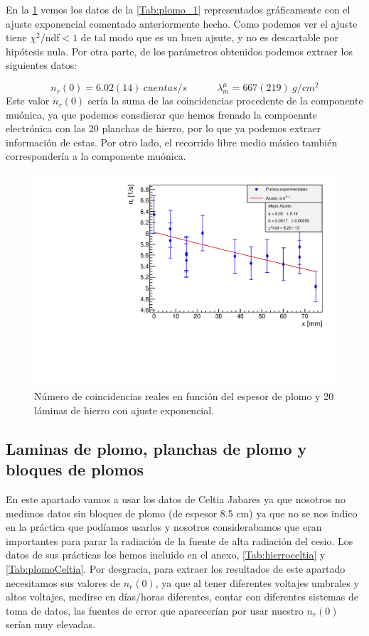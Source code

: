 \documentclass[11pt]{article}
\newcommand{\tquad}{\quad \quad \quad}
\begin{document}
En la \cref{Fig:plomohierro} vemos los datos de la \cref{Tab:plomo_1} representados gráficamente con el ajuste exponencial comentado anteriormente hecho. Como podemos ver el ajuste tiene $\chi^2/$ndf$<1$ de tal modo que es un buen ajsute, y no es descartable por hipótesis nula. Por otra parte, de los parámetros obtenidos podemos extraer los siguientes datos: 

\begin{equation}
	n_r(0) = 6.02(14) \ \unit{cuentas/s}  \tquad \lambda^\mu_m = 667(219) \ \unit{g/cm^2}
\end{equation}
Este valor $n_r(0)$ sería la suma de las coincidencias procedente de la componente muónica, ya que podemos consdierar que hemos frenado la compoennte electrónica con las 20 planchas de hierro, por lo que ya podemos extraer información de estas. Por otro lado, el recorrido libre medio másico también correspondería a la componente muónica. 

\begin{figure}[h!] \centering	
	\caption{Número de coincidencias reales en función del espesor de plomo y 20 láminas de hierro con ajuste exponencial.}
	\label{Fig:plomohierro}
	\includegraphics[width=0.72\linewidth]{../Graficas/Plomo.pdf}
\end{figure}

\subsection{Laminas de plomo, planchas de plomo y bloques de plomos}

En este apartado vamos a usar los datos de Celtia Jabares ya que nosotros no medimos datos sin bloques de plomo (de espesor 8.5 cm) ya que no se nos indico en la práctica que podíamos usarlos y nosotros considerabamos que eran importantes para parar la radiación de la fuente de alta radiación del cesio. Los datos de sus prácticas los hemos incluido en el anexo, \cref{Tab:hierroceltia} y \cref{Tab:plomoCeltia}. Por desgracia, para extraer los resultados de este apartado necesitamos sus valores de $n_r(0)$, ya que al tener diferentes voltajes umbrales y altos voltajes, medirse en días/horas diferentes, contar con diferentes sistemas de toma de datos, las fuentes de error que aparecerían por usar nuestro $n_r(0)$ serían muy elevadas. 
\end{document}
